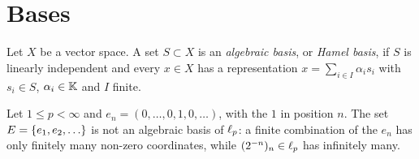 %
%

\section{Bases}

\begin{definition}\label{def:hamel}
Let $X$ be a vector space. A set $S \subset X$ is an \emph{algebraic basis},
or \emph{Hamel basis}, if $S$ is linearly independent and every $x \in X$ has
a representation $x = \sum_{i \in I} \alpha_i s_i$ with $s_i \in S$,
$\alpha_i \in \mathbb{K}$ and $I$ finite.
\end{definition}

\begin{example}\label{ex:E-not-hamel}
Let $1 \le p < \infty$ and $e_n = (0, \dots, 0, 1, 0, \dots)$, with the $1$
in position $n$. The set $E = \set{e_1, e_2, \dots}$ is not an algebraic
basis of $\ell_{p}$: a finite combination of the $e_n$ has only finitely many
non-zero coordinates, while $(2^{-n})_n \in \ell_{p}$ has infinitely many.
\end{example}


